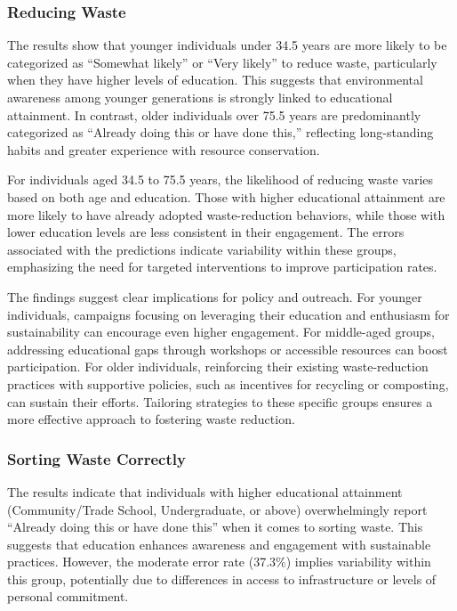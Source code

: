 \documentclass[
  letterpaper,
  DIV=11,
  numbers=noendperiod]{scrartcl}
\begin{document}
\subsubsection{Reducing Waste}\label{reducing-waste}

The results show that younger individuals under 34.5 years are more
likely to be categorized as ``Somewhat likely'' or ``Very likely'' to
reduce waste, particularly when they have higher levels of education.
This suggests that environmental awareness among younger generations is
strongly linked to educational attainment. In contrast, older
individuals over 75.5 years are predominantly categorized as ``Already
doing this or have done this,'' reflecting long-standing habits and
greater experience with resource conservation.

For individuals aged 34.5 to 75.5 years, the likelihood of reducing
waste varies based on both age and education. Those with higher
educational attainment are more likely to have already adopted
waste-reduction behaviors, while those with lower education levels are
less consistent in their engagement. The errors associated with the
predictions indicate variability within these groups, emphasizing the
need for targeted interventions to improve participation rates.

The findings suggest clear implications for policy and outreach. For
younger individuals, campaigns focusing on leveraging their education
and enthusiasm for sustainability can encourage even higher engagement.
For middle-aged groups, addressing educational gaps through workshops or
accessible resources can boost participation. For older individuals,
reinforcing their existing waste-reduction practices with supportive
policies, such as incentives for recycling or composting, can sustain
their efforts. Tailoring strategies to these specific groups ensures a
more effective approach to fostering waste reduction.

\subsubsection{Sorting Waste Correctly}\label{sorting-waste-correctly}

The results indicate that individuals with higher educational attainment
(Community/Trade School, Undergraduate, or above) overwhelmingly report
``Already doing this or have done this'' when it comes to sorting waste.
This suggests that education enhances awareness and engagement with
sustainable practices. However, the moderate error rate (37.3\%) implies
variability within this group, potentially due to differences in access
to infrastructure or levels of personal commitment.
\end{document}
